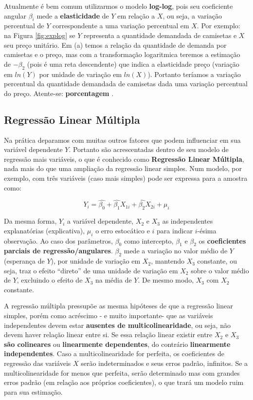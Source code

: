 \documentclass[
  openany]{book}
\begin{document}
Atualmente é bem comum utilizarmos o modelo \textbf{log-log}, pois seu coeficiente angular \(\beta_i\) mede a \textbf{elasticidade} de \(Y\) em relação a \(X\), ou seja, a variação percentual de \(Y\) correspondente a uma variação percentual em \(X\). Por exemplo: na Figura \ref{fig:explog} se \(Y\) representa a quantidade demandada de camisetas e \(X\) seu preço unitário. Em (a) temos a relação da quantidade de demanda por camisetas e o preço, mas com a transformação logaritmica teremos a estimação de \(-\beta_2\) (pois é uma reta descendente) que indica a elasticidade preço (variação em \(ln(Y)\) por unidade de variação em \(ln(X)\)). Portanto teríamos a variação percentual da quantidade demandada de camisetas dada uma variação percentual do preço. Atente-se: \textbf{porcentagem} \citep{gujarati2011econometria}.

\hypertarget{regmult}{%
\subsection{Regressão Linear Múltipla}\label{regmult}}

Na prática deparamos com muitas outros fatores que podem influenciar em sua variável dependente \(Y\). Portanto são acrescentadas dentro de seu modelo de regressão mais variáveis, o que é conhecido como \textbf{Regressão Linear Múltipla}, nada mais do que uma ampliação da regressão linear simples. Num modelo, por exemplo, com três variáveis (caso mais simples) pode ser expressa para a amostra como:

\begin{equation}
    Y_i=\hat{\beta_0}+\hat{\beta_{1}}X_{1i}+\hat{\beta_{2}}X_{2i}+\mu_i
    \label{eq:regmult}
\end{equation}

Da mesma forma, \(Y_i\) a variável dependente, \(X_{2}\) e \(X_{3}\) as independentes explanatórias (explicativa), \(\mu_i\) o erro estocático e \(i\) para indicar \(i\)-ésima observação. Ao caso dos parâmetros, \(\beta_0\) como intercepto, \(\beta_1\) e \(\beta_2\) os \textbf{coeficientes parciais de regressão/angulares}. \(\beta_2\) mede a variação no valor médio de \(Y\) (esperança de \(Y\)), por unidade de variação em \(X_2\), mantendo \(X_3\) constante, ou seja, traz o efeito ``direto'' de uma unidade de variação em \(X_2\) sobre o valor médio de \(Y\), excluindo o efeito de \(X_3\) na média de \(Y\). De mesmo modo, \(X_3\) com \(X_2\) constante.

A regressão múltipla pressupõe as mesma hipóteses de que a regressão linear simples, porém como acréscimo - e muito importante- que as variáveis independentes devem estar \textbf{ausentes de multicolinearidade}, ou seja, não devem haver relação linear entre si. Se essa relação linear existir entre \(X_2\) e \(X_3\) \textbf{são colineares} ou \textbf{linearmente dependentes}, do contrário \textbf{linearmente independentes}. Caso a multicolinearidade for perfeita, os coeficientes de regressão das variáveis \(X\) serão indeterminados e seus erros padrão, infinitos. Se a multicolinearidade for menos que perfeita, serão determinado mas com grandes erros padrão (em relação aos próprios
coeficientes), o que trará um modelo ruim para sua estimação.
\end{document}
